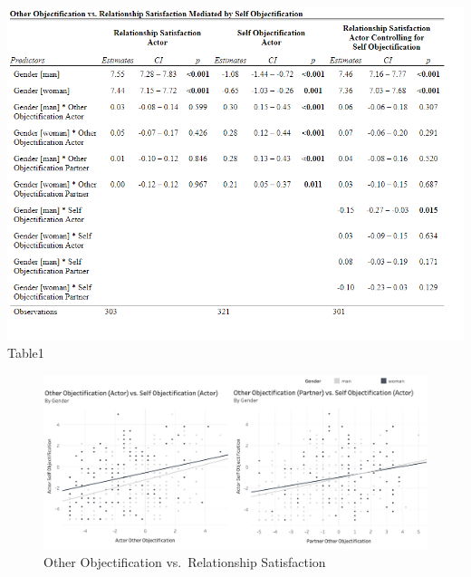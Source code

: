 \documentclass[
  english,
  man]{apa6}
\begin{document}
\includegraphics{Images/ResultsTableEdited.png} Table1

\centering

\begin{figure}
\centering
\includegraphics{Images/OO_vs_RSA.png}
\caption{Other Objectification vs.~Relationship Satisfaction}
\end{figure}
\end{document}
